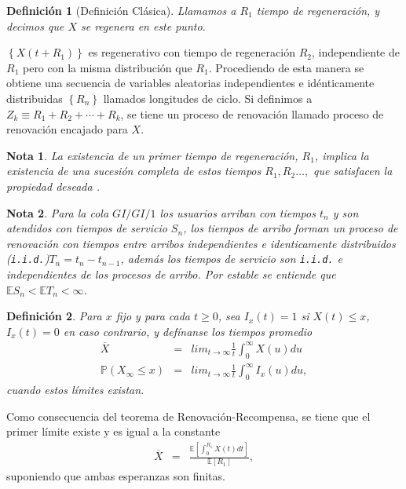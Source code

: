 \documentclass{article}
\newtheorem{Def}{Definición}[section]
\newtheorem{Note}{Nota}[section]
\newcommand{\esp}{\mathbb{E}}
\newcommand{\prob}{\mathbb{P}}
\numberwithin{equation}{section}
\begin{document}
{\begin{Def}[Definici\'on Cl\'asica]
Llamamos a $R_{1}$ tiempo de regeneraci\'on, y decimos que $X$ se regenera en este punto.
\end{Def}

$\left\{X\left(t+R_{1}\right)\right\}$ es regenerativo con tiempo de regeneraci\'on $R_{2}$, independiente de $R_{1}$ pero con la misma distribuci\'on que $R_{1}$. Procediendo de esta manera se obtiene una secuencia de variables aleatorias independientes e id\'enticamente distribuidas $\left\{R_{n}\right\}$ llamados longitudes de ciclo. Si definimos a $Z_{k}\equiv R_{1}+R_{2}+\cdots+R_{k}$, se tiene un proceso de renovaci\'on llamado proceso de renovaci\'on encajado para $X$.


\begin{Note}
La existencia de un primer tiempo de regeneraci\'on, $R_{1}$, implica la existencia de una sucesi\'on completa de estos tiempos $R_{1},R_{2}\ldots,$ que satisfacen la propiedad deseada \cite{Sigman2}.
\end{Note}


\begin{Note} Para la cola $GI/GI/1$ los usuarios arriban con tiempos $t_{n}$ y son atendidos con tiempos de servicio $S_{n}$, los tiempos de arribo forman un proceso de renovaci\'on  con tiempos entre arribos independientes e identicamente distribuidos (\texttt{i.i.d.})$T_{n}=t_{n}-t_{n-1}$, adem\'as los tiempos de servicio son \texttt{i.i.d.} e independientes de los procesos de arribo. Por \textit{estable} se entiende que $\esp S_{n}<\esp T_{n}<\infty$.
\end{Note}
 


\begin{Def}
Para $x$ fijo y para cada $t\geq0$, sea $I_{x}\left(t\right)=1$ si $X\left(t\right)\leq x$,  $I_{x}\left(t\right)=0$ en caso contrario, y def\'inanse los tiempos promedio
\begin{eqnarray*}
\overline{X}&=&lim_{t\rightarrow\infty}\frac{1}{t}\int_{0}^{\infty}X\left(u\right)du\\
\prob\left(X_{\infty}\leq x\right)&=&lim_{t\rightarrow\infty}\frac{1}{t}\int_{0}^{\infty}I_{x}\left(u\right)du,
\end{eqnarray*}
cuando estos l\'imites existan.
\end{Def}

Como consecuencia del teorema de Renovaci\'on-Recompensa, se tiene que el primer l\'imite  existe y es igual a la constante
\begin{eqnarray*}
\overline{X}&=&\frac{\esp\left[\int_{0}^{R_{1}}X\left(t\right)dt\right]}{\esp\left[R_{1}\right]},
\end{eqnarray*}
suponiendo que ambas esperanzas son finitas.
 
}
\end{document}
